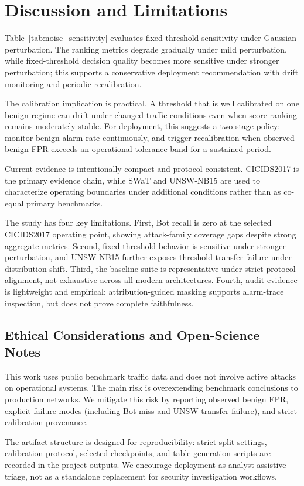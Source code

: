 \section{Discussion and Limitations}\label{sec:discussion}

Table~\ref{tab:noise_sensitivity} evaluates fixed-threshold sensitivity under Gaussian perturbation. The ranking metrics degrade gradually under mild perturbation, while fixed-threshold decision quality becomes more sensitive under stronger perturbation; this supports a conservative deployment recommendation with drift monitoring and periodic recalibration.



The calibration implication is practical. A threshold that is well calibrated on one benign regime can drift under changed traffic conditions even when score ranking remains moderately stable. For deployment, this suggests a two-stage policy: monitor benign alarm rate continuously, and trigger recalibration when observed benign FPR exceeds an operational tolerance band for a sustained period.

Current evidence is intentionally compact and protocol-consistent. CICIDS2017 is the primary evidence chain, while SWaT and UNSW-NB15 are used to characterize operating boundaries under additional conditions rather than as co-equal primary benchmarks.

The study has four key limitations. First, Bot recall is zero at the selected CICIDS2017 operating point, showing attack-family coverage gaps despite strong aggregate metrics. Second, fixed-threshold behavior is sensitive under stronger perturbation, and UNSW-NB15 further exposes threshold-transfer failure under distribution shift. Third, the baseline suite is representative under strict protocol alignment, not exhaustive across all modern architectures. Fourth, audit evidence is lightweight and empirical: attribution-guided masking supports alarm-trace inspection, but does not prove complete faithfulness.

\subsection{Ethical Considerations and Open-Science Notes}
This work uses public benchmark traffic data and does not involve active attacks on operational systems. The main risk is overextending benchmark conclusions to production networks. We mitigate this risk by reporting observed benign FPR, explicit failure modes (including Bot miss and UNSW transfer failure), and strict calibration provenance.

The artifact structure is designed for reproducibility: strict split settings, calibration protocol, selected checkpoints, and table-generation scripts are recorded in the project outputs. We encourage deployment as analyst-assistive triage, not as a standalone replacement for security investigation workflows.
